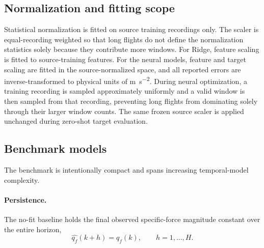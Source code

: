 \documentclass[preprint,12pt]{elsarticle}
\newcommand{\qf}{q_f}
\begin{document}
\subsection{Normalization and fitting scope}

Statistical normalization is fitted on source training recordings only. The scaler is equal-recording weighted so that long flights do not define the normalization statistics solely because they contribute more windows. For Ridge, feature scaling is fitted to source-training features. For the neural models, feature and target scaling are fitted in the source-normalized space, and all reported errors are inverse-transformed to physical units of \si{\metre\per\second\squared}. During neural optimization, a training recording is sampled approximately uniformly and a valid window is then sampled from that recording, preventing long flights from dominating solely through their larger window counts. The same frozen source scaler is applied unchanged during zero-shot target evaluation.

\subsection{Benchmark models}

The benchmark is intentionally compact and spans increasing temporal-model complexity.

\paragraph{Persistence.}
The no-fit baseline holds the final observed specific-force magnitude constant over the entire horizon,
\begin{equation}
\widehat{\qf}(k+h)=\qf(k),\qquad h=1,\ldots,H.
\end{equation}
\end{document}
